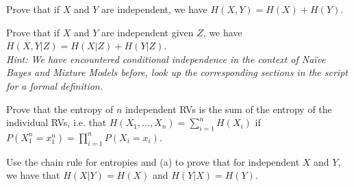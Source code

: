 \documentclass[a4paper,10pt,landscape,twocolumn]{scrartcl}
\begin{document}

\begin{exercise}
  
  \begin{subex}
    Prove that if $X$ and $Y$ are independent, we have $H(X,Y)=H(X) + H(Y)$. 
  \end{subex}
  
  \begin{subex}
    Prove that if $X$ and $Y$ are independent given $Z$, we have 
    $H(X,Y|Z) = H(X|Z) + H(Y|Z)$. 
    \\
    \emph{Hint: We have encountered conditional independence in the context of
    Na{\"i}ve Bayes and Mixture Models before, look up the corresponding
    sections in the script for a formal definition.}
  \end{subex}

  \begin{subex}
    Prove that the entropy of $n$ independent RVs is the sum of the entropy of
    the individual RVs, i.e. that  $H(X_1, ..., X_n) = \sum_{i=1}^{n} H(X_{i})$
    if $P(X_1^n=x_1^n) = \prod_{i = 1}^n P(X_i=x_i)$.
  \end{subex}
  
  \begin{subex}
    Use the chain rule for entropies and (a) to prove that for independent $X$
    and $Y$, we have that $H(X|Y) = H(X)$ and $H(Y|X) = H(Y)$.
  \end{subex}
\end{exercise}
\end{document}
